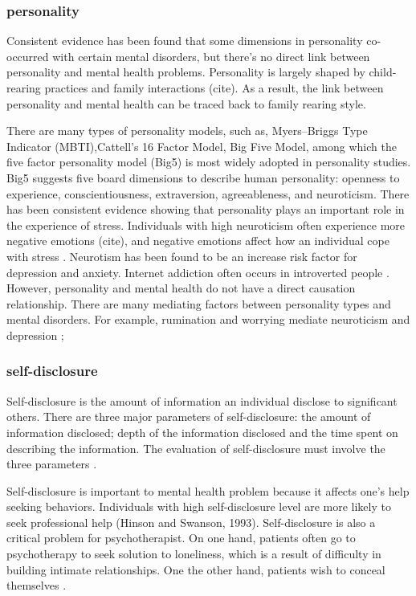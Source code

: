 \subsubsection{personality}

Consistent evidence has been found that some dimensions in personality co-occurred with certain mental disorders, but there's no direct link between personality and mental health problems. Personality is largely shaped by child-rearing practices and family interactions (cite). As a result, the link between personality and mental health can be traced back to family rearing style.

There are many types of personality models, such as, Myers–Briggs Type Indicator (MBTI),Cattell’s 16 Factor Model, Big Five Model, among which the five factor personality model (Big5) is most widely adopted in personality studies. Big5 suggests five board dimensions to describe human personality:  openness to experience, conscientiousness, extraversion, agreeableness, and neuroticism. There has been consistent evidence showing that personality plays an important role in the experience of stress. Individuals with high neuroticism often experience more negative emotions (cite), and negative emotions affect how an individual cope with stress \cite{kiecolt2002emotions}. Neurotism has been found to be an increase risk factor for depression and anxiety. \cite{talley1986association,cattell1961meaning} Internet addiction often occurs in introverted people \cite{xiuqin2010mental}. However, personality and mental health do not have a direct causation relationship. There are many mediating factors between personality types and mental disorders. For example, rumination and worrying mediate neuroticism and depression \cite{roelofs2008rumination};

\subsubsection{self-disclosure}
Self-disclosure is the amount of information an individual disclose to significant others. There are three major parameters of self-disclosure: the amount of information disclosed; depth of the information disclosed and the time spent on describing the information. The evaluation of self-disclosure must involve the three parameters \cite{cozby1973self}.


Self-disclosure is important to mental health problem because it affects one's help seeking behaviors. Individuals with high self-disclosure level are more likely to seek professional help (Hinson and Swanson, 1993). Self-disclosure is also a critical problem for psychotherapist. On one hand, patients often go to psychotherapy to seek solution to loneliness, which is a result of difficulty in building intimate relationships. One the other hand, patients wish to conceal themselves \cite{fisher1990shared, stricker1990self}. 

